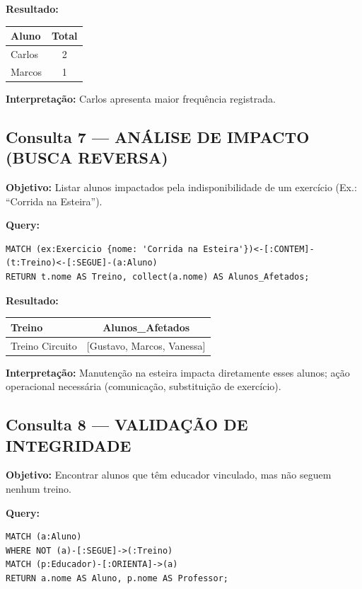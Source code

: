 \documentclass[12pt,a4paper]{article}
\begin{document}
\textbf{Resultado:}
\begin{table}[h]
\centering
\begin{tabular}{lc}
\toprule
Aluno & Total \\
\midrule
Carlos & 2 \\
Marcos & 1 \\
\bottomrule
\end{tabular}
\end{table}

\textbf{Interpretação:} Carlos apresenta maior frequência registrada.

\subsection{Consulta 7 — ANÁLISE DE IMPACTO (BUSCA REVERSA)}

\textbf{Objetivo:} Listar alunos impactados pela indisponibilidade de um exercício (Ex.: ``Corrida na Esteira'').

\textbf{Query:}
\lstset{caption=Consulta 7 - Análise de Impacto}
\begin{lstlisting}
MATCH (ex:Exercicio {nome: 'Corrida na Esteira'})<-[:CONTEM]-(t:Treino)<-[:SEGUE]-(a:Aluno)
RETURN t.nome AS Treino, collect(a.nome) AS Alunos_Afetados;
\end{lstlisting}

\textbf{Resultado:}
\begin{table}[h]
\centering
\begin{tabular}{lc}
\toprule
Treino & Alunos\_Afetados \\
\midrule
Treino Circuito & [Gustavo, Marcos, Vanessa] \\
\bottomrule
\end{tabular}
\end{table}

\textbf{Interpretação:} Manutenção na esteira impacta diretamente esses alunos; ação operacional necessária (comunicação, substituição de exercício).

\subsection{Consulta 8 — VALIDAÇÃO DE INTEGRIDADE}

\textbf{Objetivo:} Encontrar alunos que têm educador vinculado, mas não seguem nenhum treino.

\textbf{Query:}
\lstset{caption=Consulta 8 - Validação de Integridade}
\begin{lstlisting}
MATCH (a:Aluno)
WHERE NOT (a)-[:SEGUE]->(:Treino)
MATCH (p:Educador)-[:ORIENTA]->(a)
RETURN a.nome AS Aluno, p.nome AS Professor;
\end{lstlisting}
\end{document}
